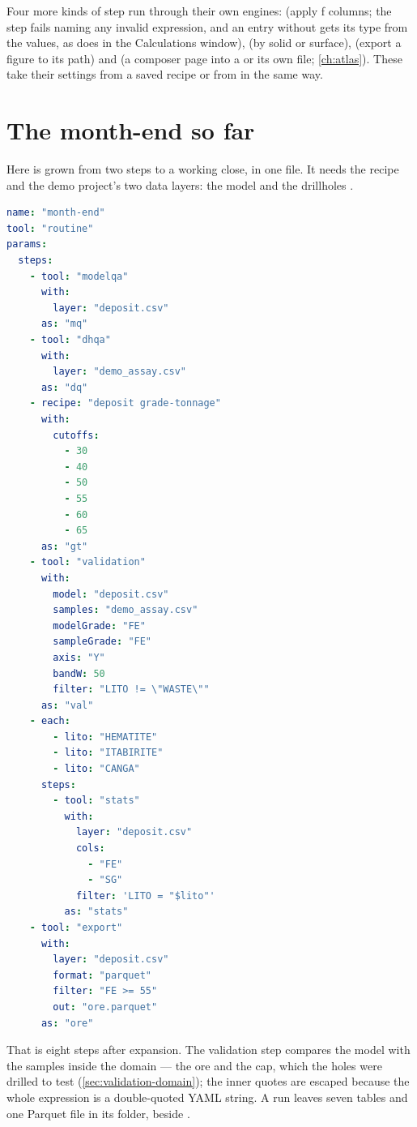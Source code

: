 Four more kinds of step run through their own engines:  (apply ƒ columns; the step fails naming any invalid expression, and an entry without  gets its type from the values, as  does in the Calculations window),  (by solid or surface),  (export a figure to its  path) and  (a composer page into a  or its own  file; \cref{ch:atlas}). These take their settings from a saved recipe or from  in the same way.

\section{The month-end so far}\label{sec:routines-monthend}
Here is  grown from two steps to a working close, in one file. It needs the recipe  and the demo project's two data layers: the model  and the drillholes .

\begin{lstlisting}[language=yaml]
name: "month-end"
tool: "routine"
params:
  steps:
    - tool: "modelqa"
      with:
        layer: "deposit.csv"
      as: "mq"
    - tool: "dhqa"
      with:
        layer: "demo_assay.csv"
      as: "dq"
    - recipe: "deposit grade-tonnage"
      with:
        cutoffs:
          - 30
          - 40
          - 50
          - 55
          - 60
          - 65
      as: "gt"
    - tool: "validation"
      with:
        model: "deposit.csv"
        samples: "demo_assay.csv"
        modelGrade: "FE"
        sampleGrade: "FE"
        axis: "Y"
        bandW: 50
        filter: "LITO != \"WASTE\""
      as: "val"
    - each:
        - lito: "HEMATITE"
        - lito: "ITABIRITE"
        - lito: "CANGA"
      steps:
        - tool: "stats"
          with:
            layer: "deposit.csv"
            cols:
              - "FE"
              - "SG"
            filter: 'LITO = "$lito"'
          as: "stats"
    - tool: "export"
      with:
        layer: "deposit.csv"
        format: "parquet"
        filter: "FE >= 55"
        out: "ore.parquet"
      as: "ore"
\end{lstlisting}

That is eight steps after expansion. The validation step compares the model with the samples inside the domain  — the ore and the cap, which the holes were drilled to test (\cref{sec:validation-domain}); the inner quotes are escaped because the whole expression is a double-quoted YAML string. A run leaves seven tables and one Parquet file in its folder, beside .

